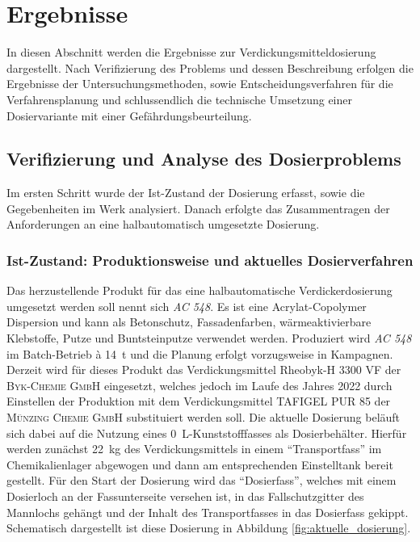 \newpage
\section{Ergebnisse}
\label{sec:ergebnisse}

In diesen Abschnitt werden die Ergebnisse zur Verdickungsmitteldosierung dargestellt. Nach Verifizierung des Problems und dessen Beschreibung erfolgen die Ergebnisse der Untersuchungsmethoden, sowie Entscheidungsverfahren für die Verfahrensplanung und schlussendlich die technische Umsetzung einer Dosiervariante mit einer Gefährdungsbeurteilung.

\subsection{Verifizierung und Analyse des Dosierproblems}
Im ersten Schritt wurde der Ist-Zustand der Dosierung erfasst, sowie die Gegebenheiten im Werk analysiert. Danach erfolgte das Zusammentragen der Anforderungen an eine halbautomatisch umgesetzte Dosierung.
 
\subsubsection{Ist-Zustand: Produktionsweise und aktuelles Dosierverfahren}
Das herzustellende Produkt für das eine halbautomatische Verdickerdosierung umgesetzt werden soll nennt sich \textit{AC 548}. Es ist eine Acrylat-Copolymer Dispersion und kann als Betonschutz, Fassadenfarben, wärmeaktivierbare Klebstoffe, Putze und Buntsteinputze verwendet werden. Produziert wird \textit{AC 548} im Batch-Betrieb à \SI{14}{\tonne} und die Planung erfolgt vorzugsweise in Kampagnen. \cite{ALBO.22.02.2022} \linebreak
Derzeit wird für dieses Produkt das Verdickungsmittel Rheobyk-H 3300 VF der \textsc{Byk-Chemie GmbH} eingesetzt, welches jedoch im Laufe des Jahres 2022 durch Einstellen der Produktion mit dem Verdickungsmittel TAFIGEL PUR 85 der \textsc{Münzing Chemie GmbH} substituiert werden soll. Die aktuelle Dosierung beläuft sich dabei auf die Nutzung eines \SI{0}{\liter}-Kunststofffasses als Dosierbehälter. Hierfür werden zunächst \SI{22}{\kilo \gram} des Verdickungsmittels in einem "`Transportfass"' im Chemikalienlager abgewogen und dann am entsprechenden Einstelltank bereit gestellt. Für den Start der Dosierung wird das "`Dosierfass"', welches mit einem Dosierloch an der Fassunterseite versehen ist, in das Fallschutzgitter des Mannlochs gehängt und der Inhalt des Transportfasses in das Dosierfass gekippt. Schematisch dargestellt ist diese Dosierung in Abbildung \ref{fig:aktuelle_dosierung}.

